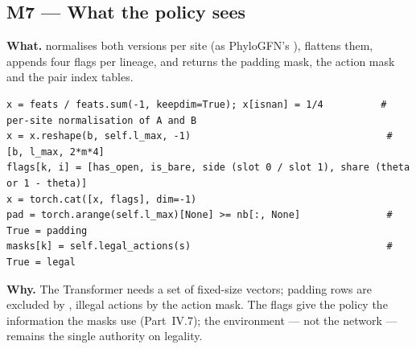 \subsection{M7 --- What the policy sees}
\textbf{What.}  normalises both versions per site (as PhyloGFN's ), flattens them, appends four flags per lineage, and returns the padding mask, the action mask and the pair index tables.
\begin{lstlisting}
x = feats / feats.sum(-1, keepdim=True); x[isnan] = 1/4          # per-site normalisation of A and B
x = x.reshape(b, self.l_max, -1)                                  # [b, l_max, 2*m*4]
flags[k, i] = [has_open, is_bare, side (slot 0 / slot 1), share (theta or 1 - theta)]
x = torch.cat([x, flags], dim=-1)
pad = torch.arange(self.l_max)[None] >= nb[:, None]               # True = padding
masks[k] = self.legal_actions(s)                                  # True = legal
\end{lstlisting}
\textbf{Why.} The Transformer needs a set of fixed-size vectors; padding rows are excluded by , illegal actions by the action mask. The flags give the policy the information the masks use (Part~IV.7); the environment --- not the network --- remains the single authority on legality.

